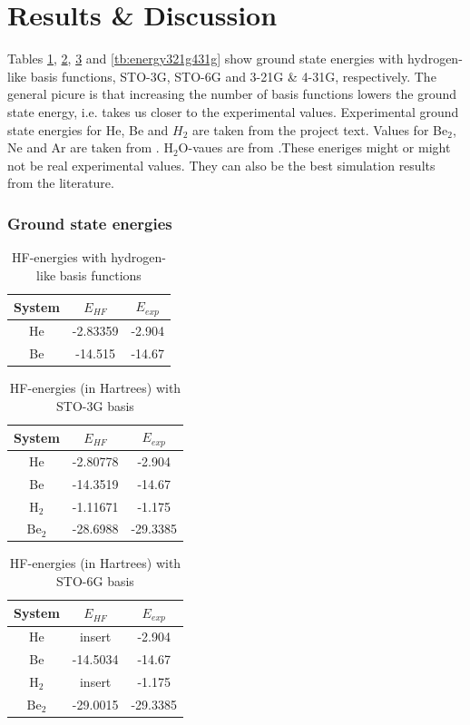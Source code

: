 \documentclass[a4paper,10pt, twocolumn, pre]{revtex4}
\begin{document}
\part{Results \& Discussion}

Tables \ref{tb:energy_hydrogenlike}, \ref{tb:energy_sto3g}, \ref{tb:energy_sto6g} and \ref{tb:energy321g431g} show ground state energies with hydrogen-like basis functions, STO-3G, STO-6G and 3-21G \& 4-31G, respectively. The general picure is that increasing the number of basis functions lowers the ground state energy, i.e. takes us closer to the experimental values. Experimental ground state energies for He, Be and $H_2$ are taken from the project text. Values for Be$_2$, Ne and Ar are taken from \cite{hogberget2013quantum}. H$_2$O-vaues are from \cite{Feller1987}.These eneriges might or might not be real experimental values. They can also be the best simulation results from the literature.

\section{Ground state energies}
\begin{table}[h!tb]
\caption{HF-energies with hydrogen-like basis functions}
\label{tb:energy_hydrogenlike}
\begin{tabular}[c]{c|c|c}
System & $E_{HF}$ & $E_{exp}$ \\
\hline
He & -2.83359 & -2.904 \\
Be & -14.515 & -14.67
\end{tabular}
\end{table}

\begin{table}[h!tb]
\caption{HF-energies (in Hartrees) with STO-3G basis}
\label{tb:energy_sto3g}
\begin{tabular}[c]{c|c|c}
System & $E_{HF}$ & $E_{exp}$ \\
\hline
He & -2.80778 & -2.904  \\
Be & -14.3519 & -14.67 \\
$\mbox{H}_2$ & -1.11671 & -1.175 \\
$\mbox{Be}_2$ & -28.6988 & -29.3385 \\
\end{tabular}
\end{table}

\begin{table}[h!tb]
\caption{HF-energies (in Hartrees) with STO-6G basis}
\label{tb:energy_sto6g}
\begin{tabular}[c]{c|c|c}
System & $E_{HF}$ & $E_{exp}$ \\
\hline
He & insert & -2.904 \\
Be & -14.5034 & -14.67 \\
$\mbox{H}_2$ & insert & -1.175 \\
$\mbox{Be}_2$ & -29.0015 & -29.3385 \\
\end{tabular}
\end{table}
\end{document}
